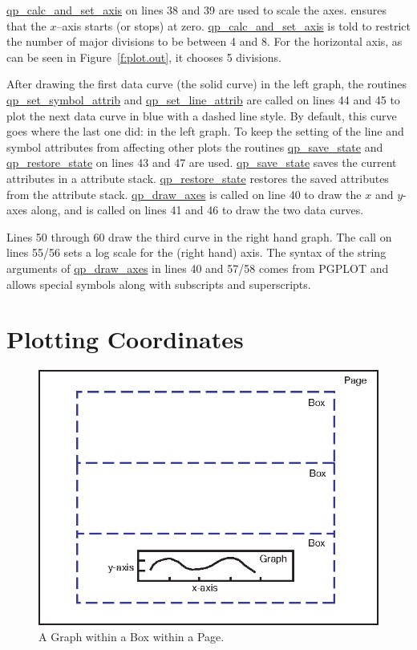 \hyperref[r:qp.calc.and.set.axis]{qp_calc_and_set_axis} on lines 38 and 39 are used to scale the
axes.  ensures that the $x$--axis starts (or stops)
at zero.  \hyperref[r:qp.calc.and.set.axis]{qp_calc_and_set_axis} is told to restrict the number of
major divisions to be between 4 and 8. For the horizontal axis, as can be
seen in Figure~\ref{f:plot.out}, it chooses 5 divisions.

After drawing the first data curve (the solid curve) in the left
graph, the routines \hyperref[r:qp.set.symbol.attrib]{qp_set_symbol_attrib} and
\hyperref[r:qp.set.line.attrib]{qp_set_line_attrib} are called on lines 44 and 45 to plot the
next data curve in blue with a dashed line style. By default, this
curve goes where the last one did: in the left graph. To keep the
setting of the line and symbol attributes from affecting other plots
the routines \hyperref[r:qp.save.state]{qp_save_state} and 
\hyperref[r:qp.restore.state]{qp_restore_state} on lines
43 and 47 are used. \hyperref[r:qp.save.state]{qp_save_state} saves the current attributes
in a attribute stack. \hyperref[r:qp.restore.state]{qp_restore_state} restores the saved
attributes from the attribute stack. \hyperref[r:qp.draw.axes]{qp_draw_axes} is called on
line 40 to draw the $x$ and $y$-axes along, and  is called
on lines 41 and 46 to draw the two data curves.

Lines 50 through 60 draw the third curve in the right hand graph.  The
 call on lines 55/56 sets a log scale for the 
(right hand) axis. The syntax of the string arguments of
\hyperref[r:qp.draw.axes]{qp_draw_axes} in lines 40 and 57/58 comes from PGPLOT and allows
special symbols along with subscripts and superscripts.

\section{Plotting Coordinates}
\label{s:plot.coords}

\begin{figure}
  \centering
  \includegraphics{plot-coords.eps}
  \caption{A Graph within a Box within a Page.}
  \label{f:plot.coords}
\end{figure}

